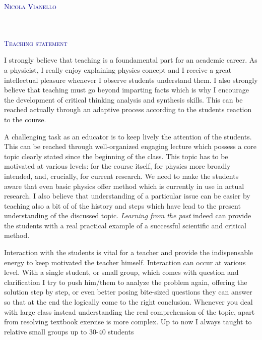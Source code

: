 \documentclass[12pt,a4paper]{article}
\begin{document}
\begin{flushright}
\textcolor{darkBlue}{ \Huge
\lettrine[lines=3,findent=-1pt, loversize = -0.42,
lraise=0.6]{N}{icola Vianello}}\\[2pt]
\textcolor{Gray}{}\\
\textcolor{Gray}{}\\
\textcolor{Gray}{}
\end{flushright}
\begin{flushleft} 
\textcolor{darkBlue}{ \Huge
\lettrine[lines=2,findent=-1pt, loversize = -0.42,
lraise=0.6]{T}{eaching statement}} 
\end{flushleft}
I strongly believe that teaching is a foundamental part for an
academic career. As a physicist, I really enjoy explaining physics
concept and I receive a great intellectual pleasure whenever I observe
students understand them. I also strongly believe that teaching must
go beyond imparting facts which is why I encourage the development of
critical thinking analysis and synthesis skills. This can be reached
actually through an adaptive process according to the students
reaction to the course. 

A challenging task as an educator is to keep lively the attention of
the students. This can be reached through well-organized engaging
lecture which possess a core topic clearly stated since the beginning
of the class. This topic has to be motivated at various levels: 
for the course itself, for physics more broadly intended, and, crucially, for current research.
We need to make the students aware
 that even basic physics offer method which is currently in use in
 actual research. I also believe that understanding of a particular
issue can be easier by teaching also a bit of 
of the history and steps which have lead to the present understanding
of the discussed topic. \emph{Learning from the past} indeed can provide the
students with a real practical example of a successful scientific
and critical method. 

Interaction with the students is vital for a teacher and provide the
indispensable energy to keep motivated the teacher
himself. Interaction can occur at various level. 
With a
single student, or small group,  which comes with question and
clarification I try to push him/them to analyze the problem again, offering
the solution step by step, or even better posing bite-sized questions
they can answer so that at the end the logically come to the right
conclusion. Whenever you deal with large class instead understanding
the real comprehension of the topic, apart from resolving textbook
exercise is more complex. Up to now I always taught to relative small
groups up to 30-40 students  
\end{document}
